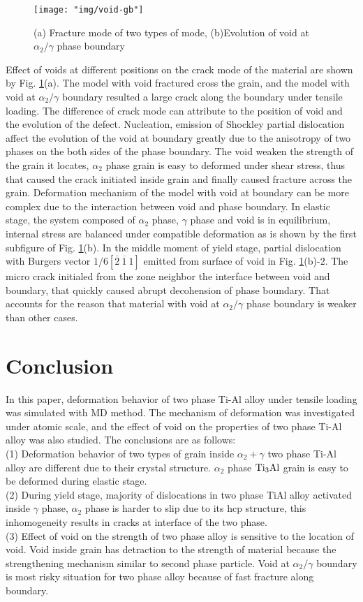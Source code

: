 \documentclass[materials,article,submit,moreauthors,pdftex,10pt,a4paper]{Definitions/mdpi}
\begin{document}
\begin{figure}[ht]
	\centering
	\texttt{[image: "img/void-gb"]}
	\caption{(a) Fracture mode of two types of mode,  (b)Evolution of void at $\alpha_2 / \gamma$ phase boundary}
	\label{fig:void-gb}
\end{figure}
Effect of voids at different positions on the crack mode of the material are shown by Fig. \ref{fig:void-gb}(a). The model with void fractured cross the grain, and the model with void at $\alpha_2 / \gamma$ boundary resulted a large crack along the boundary under tensile loading. The difference of crack mode can attribute to the position of void and the evolution of the defect. Nucleation, emission of Shockley partial dislocation affect the evolution of the void at boundary greatly due to the anisotropy of two phases on the both sides of the phase boundary. The void weaken the strength of the grain it locates,  $\alpha_2$ phase grain is easy to deformed under shear stress, thus that caused the crack initiated inside grain and finally caused fracture across the grain. Deformation mechanism of the model with void at boundary can be  more complex due to the interaction between void and phase boundary. In elastic stage, the system composed of $\alpha_2$ phase, $\gamma$ phase and void is in equilibrium, internal stress are balanced under compatible deformation as is shown by the first subfigure of Fig. \ref{fig:void-gb}(b). In the middle moment of yield stage, partial dislocation with Burgers vector $1/6[\overline{2}\ \overline{1}\ 1]$ emitted from surface of void in Fig. \ref{fig:void-gb}(b)-2. The micro crack initialed from the zone neighbor  the interface between void and boundary, that quickly caused abrupt decohension of phase boundary. That accounts for the reason that material with void at $\alpha_2 / \gamma$ phase boundary is weaker than other cases. 
\section{Conclusion}
In this paper, deformation behavior of two phase Ti-Al alloy under tensile loading was simulated with MD method. The mechanism of deformation was investigated under atomic scale, and the effect of void on the properties of two phase Ti-Al alloy was also studied.  The conclusions are as follows:\\
(1) Deformation behavior of two types of grain inside $\alpha_2+\gamma$ two phase Ti-Al alloy are different due to their crystal structure. $\alpha_2$ phase $\rm{Ti_3Al}$ grain is easy to be deformed during elastic stage.\\
(2) During yield stage, majority of dislocations in two phase TiAl alloy activated inside $\gamma$ phase, $\alpha_2$ phase is harder to slip due to its hcp structure, this inhomogeneity results in cracks at interface of the two phase. \\
(3) Effect of  void on the strength of  two phase alloy is sensitive to the location of void. Void inside grain has detraction to the strength of material because the strengthening mechanism similar to second phase particle. Void at $\alpha_2 / \gamma$ boundary is most risky situation for two phase alloy because of fast fracture along boundary.
\end{document}
